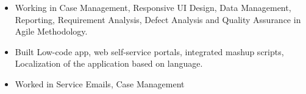 \documentclass[10pt,a4paper,ragged2e]{altacv}
\begin{document}

\begin{fullwidth}
\makecvheader
\end{fullwidth}



\begin{itemize}
\item Working in Case Management, Responsive UI Design, Data Management, Reporting, Requirement Analysis, Defect Analysis and Quality Assurance in Agile Methodology.

\smallskip
\item Built Low-code app, web self-service portals, integrated mashup scripts, Localization of the application based on language.
\end{itemize}

\begin{itemize}
\item Worked in Service Emails, Case Management

\end{itemize}
    
\end{document}
